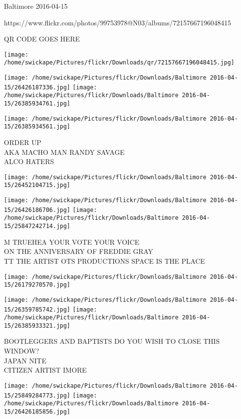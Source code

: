 \documentclass[10pt,letterpaper]{article}
\begin{document}
Baltimore 2016-04-15

https://www.flickr.com/photos/99753978@N03/albums/72157667196048415

QR CODE GOES HERE

\texttt{[image: /home/swickape/Pictures/flickr/Downloads/qr/72157667196048415.jpg]}
\pagebreak

\texttt{[image: /home/swickape/Pictures/flickr/Downloads/Baltimore 2016-04-15/26426187336.jpg]}
\texttt{[image: /home/swickape/Pictures/flickr/Downloads/Baltimore 2016-04-15/26385934761.jpg]}

\texttt{[image: /home/swickape/Pictures/flickr/Downloads/Baltimore 2016-04-15/26385934561.jpg]}

ORDER UP\\
AKA MACHO MAN RANDY SAVAGE\\
ALCO HATERS\\
\pagebreak

\texttt{[image: /home/swickape/Pictures/flickr/Downloads/Baltimore 2016-04-15/26452104715.jpg]}

\vspace{0.25in}
\texttt{[image: /home/swickape/Pictures/flickr/Downloads/Baltimore 2016-04-15/26426186706.jpg]}
\texttt{[image: /home/swickape/Pictures/flickr/Downloads/Baltimore 2016-04-15/25847242714.jpg]}

M TRUEHEA YOUR VOTE YOUR VOICE\\
ON THE ANNIVERSARY OF FREDDIE GRAY\\
TT THE ARTIST OTS PRODUCTIONS SPACE IS THE PLACE\\
\pagebreak

\texttt{[image: /home/swickape/Pictures/flickr/Downloads/Baltimore 2016-04-15/26179270570.jpg]}

\vspace{0.25in}
\texttt{[image: /home/swickape/Pictures/flickr/Downloads/Baltimore 2016-04-15/26359785742.jpg]}
\texttt{[image: /home/swickape/Pictures/flickr/Downloads/Baltimore 2016-04-15/26385933321.jpg]}

BOOTLEGGERS AND BAPTISTS DO YOU WISH TO CLOSE THIS WINDOW?\\
JAPAN NITE\\
CITIZEN ARTIST IMORE\\
\pagebreak

\texttt{[image: /home/swickape/Pictures/flickr/Downloads/Baltimore 2016-04-15/25849284773.jpg]}
\texttt{[image: /home/swickape/Pictures/flickr/Downloads/Baltimore 2016-04-15/26426185856.jpg]}
\end{document}

